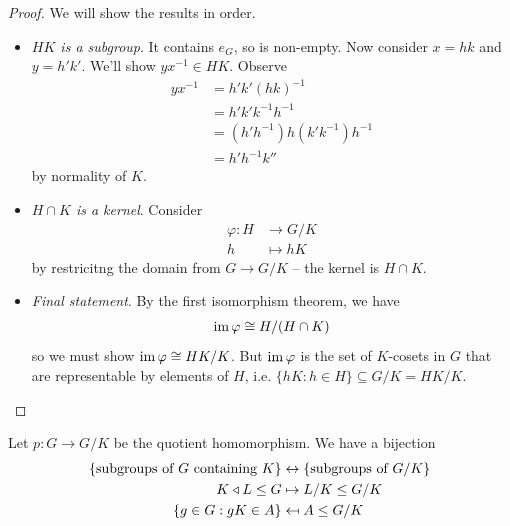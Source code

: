 \documentclass{../../template/note}
\begin{document}
    \begin{proof}
        We will show the results in order.
        \begin{itemize}
            \item \emph{$HK$ is a subgroup}. It contains $e_G$, so is non-empty. Now consider $x = hk$ and $y = h'k'$. We'll show $yx^{-1} \in HK$. Observe
            \begin{align*}
                yx^{-1} &= h'k'(hk)^{-1} \\
                &= h'k'k^{-1}h^{-1} \\
                &= (h'h^{-1})h(k'k^{-1})h^{-1} \\
                &= h'h^{-1}k''
            \end{align*}
            by normality of $K$.
        \end{itemize}
        \begin{itemize}[resume]
            \item \emph{$H \cap K$ is a kernel}. Consider
            \begin{align*}
                \varphi: H &\to G/K \\
                h &\mapsto hK
            \end{align*}
            by restricitng the domain from $G \to G/K$ -- the kernel is $H \cap K$.
            \item \emph{Final statement}. By the first isomorphism theorem, we have
            \begin{align*}
                \operatorname{im} \varphi \cong H/(H \cap K)
            \end{align*}
            so we must show $\operatorname{im} \varphi \cong HK/K$. But $\operatorname{im} \varphi$ is the set of $K$-cosets in $G$ that are representable by elements of $H$, i.e. $\{hK : h \in H\} \subseteq G/K = HK/K$.
        \end{itemize}
    \end{proof}

    \begin{theorem}
        Let $p: G \to G/K$ be the quotient homomorphism. We have a bijection
        \begin{align*}
            \{\text{subgroups of } G \text{ containing } K\}& \leftrightarrow \{\text{subgroups of } G/K\} \\
            K \triangleleft L \leq G &\mapsto L/K \leq G/K \\
            \{g \in G : gK \in A\} &\mapsfrom A \leq G/K
        \end{align*}
    \end{theorem}
\end{document}

